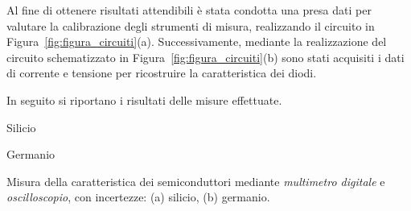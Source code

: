 \documentclass[@MAIN@]{subfiles}
\begin{document}
    Al fine di ottenere risultati attendibili è stata condotta una presa dati per valutare la
    calibrazione degli strumenti di misura, realizzando il circuito in Figura~\ref{fig:figura_circuiti}(a). Successivamente,
    mediante la realizzazione del circuito schematizzato in Figura~\ref{fig:figura_circuiti}(b)
    sono stati acquisiti i dati di corrente e tensione per ricostruire la caratteristica dei diodi.\newline

    \noindent In seguito si riportano i risultati delle misure effettuate.\newline
    \vspace{1.5}

    \begin{table}[ht]
        \centering
        \begin{subtable}[t]{.45\textwidth}
            \centering
            
            \captionsetup{justification=centering} %
            \caption{Silicio} %
            \label{tab:silicio}
        \end{subtable}
        \hfill
        \begin{subtable}[t]{.45\textwidth}
            \centering
            
            \captionsetup{justification=centering} %
            \caption{Germanio} %
            \label{tab:germanio}
        \end{subtable}

        \vspace{0.5em} %

        \caption{Misura della caratteristica dei semiconduttori mediante \textit{multimetro digitale} e
        \textit{oscilloscopio}, con incertezze: (a) silicio, (b) germanio.}
        \label{tab:tabelle_semiconduttori}

    \end{table}
    \\ \\
    \begin{center}
        
    \end{center}
\end{document}
